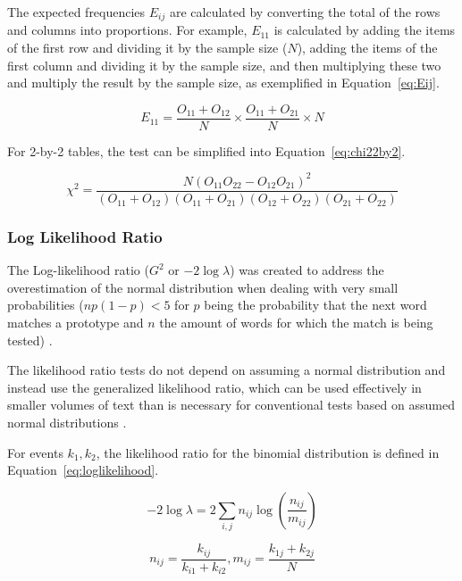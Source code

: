 The expected frequencies $E_{ij}$ are calculated by converting the total of the
rows and columns into proportions. For example, $E_{11}$ is calculated by adding
the items of the first row and dividing it by the sample size ($N$), adding the
items of the first column and dividing it by the sample size, and then
multiplying these two and multiply the result by the sample size, as exemplified
in Equation~\ref{eq:Eij}.

\begin{equation}
  \label{eq:Eij}
  E_{11} = \frac{O_{11} + O_{12}}{N} \times \frac{O_{11} + O_{21}}{N} \times N
\end{equation}

For 2-by-2 tables, the test can be simplified into Equation~\ref{eq:chi22by2}.

\begin{equation}
  \label{eq:chi22by2}
  \chi^2 =  \frac{N(O_{11}O_{22} - O_{12}O_{21})^2}
            {(O_{11} + O_{12}) (O_{11} + O_{21})
             (O_{12} + O_{22}) (O_{21} + O_{22})}
\end{equation}


\subsubsection*{Log Likelihood Ratio}

The Log-likelihood ratio ($G^2$ or $-2\log\lambda$) was created to address the
overestimation of the normal distribution when dealing with very small
probabilities ($np(1 - p) < 5$ for $p$ being the probability that the next word
matches a prototype and $n$ the amount of words for which the match is being
tested) \cite{dunning1993accurate}.

The likelihood ratio tests do not depend on assuming a normal distribution and
instead use the generalized likelihood ratio, which can be used effectively in
smaller volumes of text than is necessary for conventional tests based on
assumed normal distributions \cite{dunning1993accurate}.

For events $k_1,k_2$, the likelihood ratio for the binomial distribution is
defined in Equation~\ref{eq:loglikelihood}.

\begin{equation}
  \label{eq:loglikelihood}
  -2\log\lambda = 2 \sum_{i,j} n_{ij} \log \left( \frac{n_{ij}}{m_{ij}} \right)
\end{equation}

\begin{equation}
  n_{ij} = \frac{k_{ij}}{k_{i1} + k_{i2}}, m_{ij} = \frac{k_{1j} + k_{2j}}{N}
\end{equation}

